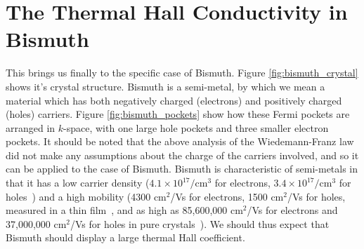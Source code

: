 \documentclass{thesis-umich}
\begin{document}
\section{The Thermal Hall Conductivity in Bismuth}

This brings us finally to the specific case of Bismuth. Figure
\ref{fig:bismuth_crystal} shows it's crystal structure. Bismuth is a
semi-metal, by which we mean a material which has both negatively charged
(electrons) and positively charged (holes) carriers. Figure \ref{fig:bismuth_pockets} show how these Fermi pockets are arranged in $k$-space, with one large hole pockets and three smaller electron pockets. It should be noted that
the above analysis of the Wiedemann-Franz law did not make any assumptions
about the charge of the carriers involved, and so it can be applied to the case
of Bismuth. Bismuth is characteristic of semi-metals in that it has a low
carrier density ($4.1 \times 10^{17} /$cm$^3$ for electrons, $3.4 \times
10^{17} /$cm$^3$ for holes~\cite{Jain1962}) and a high mobility (4300 cm$^2$/Vs
for electrons, 1500 cm$^2$/Vs for holes, measured in a thin
film~\cite{Rosenbaum2004}, and as high as 85,600,000 cm$^2$/Vs for electrons
and 37,000,000 cm$^2$/Vs for holes in pure crystals~\cite{Gallo1963}). We
should thus expect that Bismuth should display a large thermal Hall coefficient.
\end{document}
